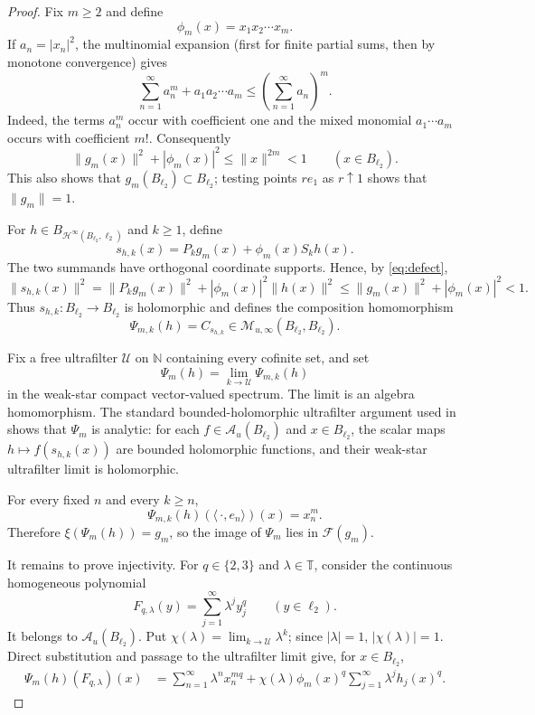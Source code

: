 \documentclass[11pt]{article}
\newcommand{\A}{\mathcal A}
\newcommand{\Hinf}{\mathcal H^\infty}
\newcommand{\B}{B_{\ell_2}}
\newcommand{\M}{\mathcal M}
\newcommand{\F}{\mathscr F}
\newcommand{\T}{\mathbb T}
\begin{document}
\begin{proof}
Fix $m\ge2$ and define
\[
 \phi_m(x)=x_1x_2\cdots x_m.
\]
If $a_n=|x_n|^2$, the multinomial expansion (first for finite partial sums,
then by monotone convergence) gives
\begin{equation}\label{eq:room}
 \sum_{n=1}^\infty a_n^m+a_1a_2\cdots a_m
 \le \left(\sum_{n=1}^\infty a_n\right)^m.
\end{equation}
Indeed, the terms $a_n^m$ occur with coefficient one and the mixed monomial
$a_1\cdots a_m$ occurs with coefficient $m!$.  Consequently
\begin{equation}\label{eq:defect}
 \|g_m(x)\|^2+|\phi_m(x)|^2\le \|x\|^{2m}<1
 \qquad(x\in\B).
\end{equation}
This also shows that $g_m(\B)\subset\B$; testing points $re_1$ as $r\uparrow1$
shows that $\|g_m\|=1$.

For $h\in B_{\Hinf(\B,\ell_2)}$ and $k\ge1$, define
\[
 s_{h,k}(x)=P_k g_m(x)+\phi_m(x)S_kh(x).
\]
The two summands have orthogonal coordinate supports.  Hence, by
\eqref{eq:defect},
\[
 \|s_{h,k}(x)\|^2
 =\|P_kg_m(x)\|^2+|\phi_m(x)|^2\|h(x)\|^2
 \le \|g_m(x)\|^2+|\phi_m(x)|^2<1.
\]
Thus $s_{h,k}:\B\to\B$ is holomorphic and defines the composition
homomorphism
\[
 \Psi_{m,k}(h)=C_{s_{h,k}}\in\M_{u,\infty}(\B,\B).
\]

Fix a free ultrafilter $\mathscr U$ on $\mathbb N$ containing every cofinite
set, and set
\[
 \Psi_m(h)=\lim_{k\to\mathscr U}\Psi_{m,k}(h)
\]
in the weak-star compact vector-valued spectrum.  The limit is an algebra
homomorphism.  The standard bounded-holomorphic ultrafilter argument used in
\cite[Lemma~2.1, Theorem~2.3, Example~2.12]{DimantSinger} shows that
$\Psi_m$ is analytic: for each $f\in\A_u(\B)$ and $x\in\B$, the scalar maps
$h\mapsto f(s_{h,k}(x))$ are bounded holomorphic functions, and their
weak-star ultrafilter limit is holomorphic.

For every fixed $n$ and every $k\ge n$,
\[
 \Psi_{m,k}(h)(\langle\,\cdot,e_n\rangle)(x)=x_n^m.
\]
Therefore $\xi(\Psi_m(h))=g_m$, so the image of $\Psi_m$ lies in
$\F(g_m)$.

It remains to prove injectivity.  For $q\in\{2,3\}$ and $\lambda\in\T$,
consider the continuous homogeneous polynomial
\[
 F_{q,\lambda}(y)=\sum_{j=1}^\infty \lambda^j y_j^q
 \qquad(y\in\ell_2).
\]
It belongs to $\A_u(\B)$.  Put
$\chi(\lambda)=\lim_{k\to\mathscr U}\lambda^k$; since $|\lambda|=1$,
$|\chi(\lambda)|=1$.  Direct substitution and passage to the ultrafilter
limit give, for $x\in\B$,
\begin{align}\label{eq:separate}
 \Psi_m(h)(F_{q,\lambda})(x)
 &=\sum_{n=1}^\infty \lambda^n x_n^{mq}
   +\chi(\lambda)\phi_m(x)^q
      \sum_{j=1}^\infty\lambda^j h_j(x)^q.
\end{align}


\end{proof}
\end{document}
